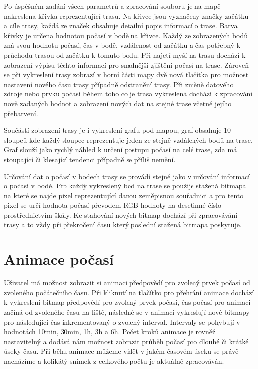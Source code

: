\documentclass[czech,bachelor,dept460,male,csharp,cpdeclaration]{diploma}
\begin{document}
	Po úspěšném zadání všech parametrů a zpracování souboru je na mapě nakreslena křivka reprezentující trasu. Na křivce jsou vyznačeny značky začátku a cíle trasy, každá ze značek obsahuje detailní popis informací o trase. Barva křivky je určena hodnotou počasí v bodě na křivce. Každý ze zobrazených bodů zná svou hodnotu počasí, čas v bodě, vzdálenost od začátku a čas potřebný k průchodu trasou od začátku k tomuto bodu. Při najetí myší na trasu dochází k zobrazení výpisu těchto informací pro snadnější zjištění počasí na trase. Zároveň se při vykreslení trasy zobrazí v horní části mapy dvě nová tlačítka pro možnost nastavení nového času trasy případně odstranění trasy. Při změně datového zdroje nebo prvku počasí během toho co je trasa vykreslená dochází k zpracování nově zadaných hodnot a zobrazení nových dat na stejné trase včetně jejího přebarvení.
	
	Součástí zobrazení trasy je i vykreslení grafu pod mapou, graf obsahuje 10 sloupců kde každý sloupec reprezentuje jeden ze stejně vzdálených bodů na trase. Graf slouží jako rychlý náhled k určení postupu počasí na celé trase, zda má stoupající či klesající tendenci případně se příliš nemění.
	
	Určování dat o počasí v bodech trasy se provádí stejně jako v určování informací o počasí v bodě. Pro každý vykreslený bod na trase se použije stažená bitmapa na které se najde pixel reprezentující danou zeměpisnou souřadnici a pro tento pixel se určí hodnota počasí převodem RGB hodnoty na desetinné číslo prostřednictvím škály. Ke stahování nových bitmap dochází při zpracovávání trasy a to vždy při překročení času který poslední stažená bitmapa poskytuje.
	
	\section{Animace počasí}
	
	Uživatel má možnost zobrazit si animaci předpovědí pro zvolený prvek počasí od zvoleného počátečního času. Při kliknutí na tlačítko pro přehrání animace dochází k vykreslení bitmap předpovědí pro zvolený prvek počasí, čas počasí pro animaci začíná od zvoleného času na liště, následně se v animaci vykreslují nové bitmapy pro následující čas inkrementovaný o zvolený interval. Intervaly se pohybují v hodnotách 10min, 30min, 1h, 3h a 6h. Počet kroků animace je rovněž nastavitelný a dodává nám možnost zobrazit průběh počasí pro dlouhé či krátké úseky času. Při běhu animace můžeme vidět v jakém časovém úseku se právě nacházíme a kolikátý snímek z celkového počtu je aktuálně zpracováván.
	
\end{document}
